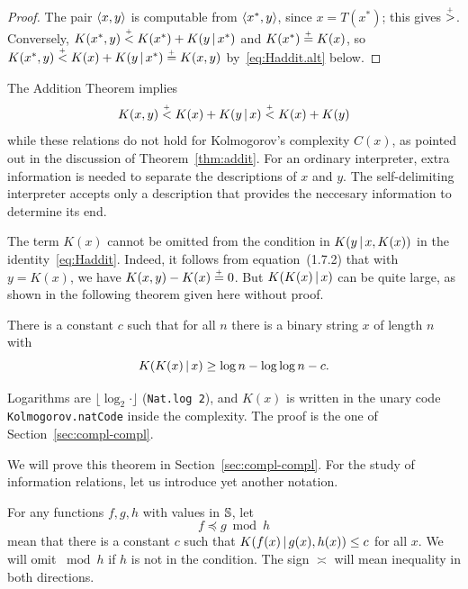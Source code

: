 \begin{proof}
  \leanok
The pair \( {\mathopen\langle x, y\mathclose\rangle} \) is computable from \( {\mathopen\langle x^{*}, y\mathclose\rangle} \), since \( x = T(x^{*}) \);
this gives \( \stackrel{{}_+}{>} \). Conversely,
\( K(x^{*}, y) \stackrel{{}_+}{<} K(x^{*}) + K(y \,\vert\, x^{*}) \) and \( K(x^{*}) \stackrel{{}_+}{=} K(x) \), so
\( K(x^{*}, y) \stackrel{{}_+}{<} K(x) + K(y \,\vert\, x^{*}) \stackrel{{}_+}{=} K(x, y) \) by~\eqref{eq:Haddit.alt} below.
\end{proof}

The Addition Theorem implies 
 \[ 	K(x,y) \stackrel{{}_+}{<} K(x) + K(y \,\vert\, x) \stackrel{{}_+}{<} K(x) + K(y) 
 \]
  while these relations do not hold for Kolmogorov's complexity
\( C(x) \), as pointed out in the discussion of Theorem~\ref{thm:addit}. 
For an ordinary interpreter, extra information is needed to separate
the descriptions of \( x \) and \( y \).  
The self-delimiting interpreter
accepts only a description that provides the neccesary information to
determine its end. 

The term \( K(x) \) cannot be omitted from the condition in \( K(y \,\vert\, x, K(x)) \) 
in the identity~\eqref{eq:Haddit}. 
Indeed, it follows from
equation~(1.7.2) that with \( y=K(x) \), we have \( K(x,y)-K(x) \stackrel{{}_+}{=} 0 \).
But \( K(K(x) \,\vert\, x) \) can be quite large, as shown in the following
theorem given here without proof.

\begin{theorem}\label{thm:compl-compl}
  \leanok
 There is a constant \( c \) such that for all \( n \)
there is a binary string \( x \) of length \( n \) with
 \[  K(K(x) \,\vert\, x) \ge \log n - \log\log n -c.
 \]
 \end{theorem}

\begin{formalization}
Logarithms are \( \lfloor \log_{2} \cdot \rfloor \) (\texttt{Nat.log 2}), and \( K(x) \) is
written in the unary code \texttt{Kolmogorov.natCode} inside the complexity. The proof is the
one of Section~\ref{sec:compl-compl}.
\end{formalization}

We will prove this theorem in Section~\ref{sec:compl-compl}.
For the study of information relations, let us introduce yet another
notation.

 \begin{definition}
  \label{def:g3.1.6}
  \leanok
For any functions \( f,g,h \) with values in \( \mathbb{S} \), let
 \[  f \preceq g \bmod h
 \]
  mean that there is a constant \( c \) such that \( K(f(x) \,\vert\, g(x),h(x))
\le c \) for all \( x \).
We will omit \( \bmod h \) if \( h \) is not in the condition.
The sign \( \asymp \) will mean inequality in both directions.
 \end{definition}


